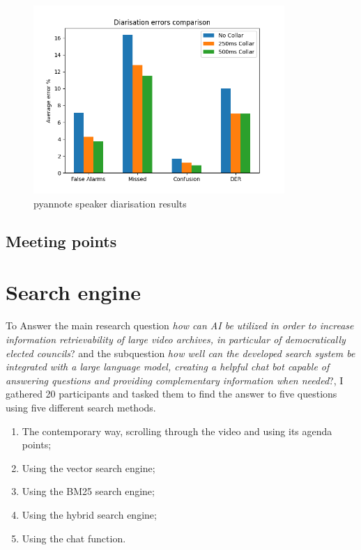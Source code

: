 \documentclass[twoside]{uva-inf-bachelor-thesis}
\begin{document}
\begin{figure}
    \centering
    \includegraphics[width=0.85\textwidth]{images/pyannoteBench.png}
    \caption{pyannote speaker diarisation results}
    \label{fig:pyanExperiment}
\end{figure}

\subsection{Meeting points}

\section{Search engine}
To Answer the main research question \textit{how can AI be utilized in order to increase information retrievability of large video archives, in particular of democratically elected councils}? and the subquestion \textit{how well can the developed search system be integrated with a large language model, creating a helpful chat bot capable of answering questions and providing complementary information when needed}?, I gathered 20 participants and tasked them to find the answer to five questions using five different search methods.

\begin{enumerate}
    \item The contemporary way, scrolling through the video and using its agenda points;
    \item Using the vector search engine;
    \item Using the BM25 search engine;
    \item Using the hybrid search engine;
    \item Using the chat function.
\end{enumerate}
\end{document}
